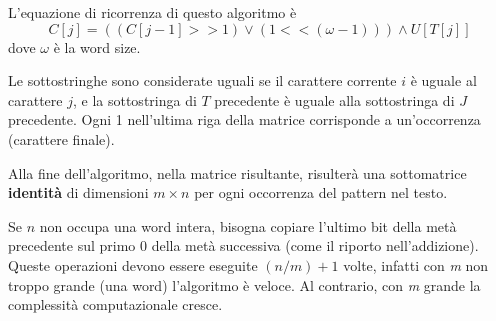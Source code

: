 L'equazione di ricorrenza di questo algoritmo è
$$C[j] = ((C[j - 1] >> 1) \lor (1 << (\omega - 1))) \land U[T[j]]$$
dove $\omega$ è la word size.

Le sottostringhe sono considerate uguali se il carattere corrente $i$ è uguale al carattere $j$, e la sottostringa di $T$ precedente è uguale alla sottostringa di $J$ precedente. 
Ogni 1 nell'ultima riga della matrice corrisponde a un'occorrenza (carattere finale).

Alla fine dell'algoritmo, nella matrice risultante, risulterà una sottomatrice \textbf{identità} di dimensioni $m \times n$ per ogni occorrenza del pattern nel testo.

Se $n$ non occupa una word intera, bisogna copiare l'ultimo bit della metà precedente sul primo 0 della metà successiva (come il riporto nell'addizione).
Queste operazioni devono essere eseguite $(n / m) + 1$ volte, infatti con \textit{m} non troppo grande (una word) l'algoritmo è veloce. Al contrario, con \textit{m} grande la complessità computazionale cresce.
